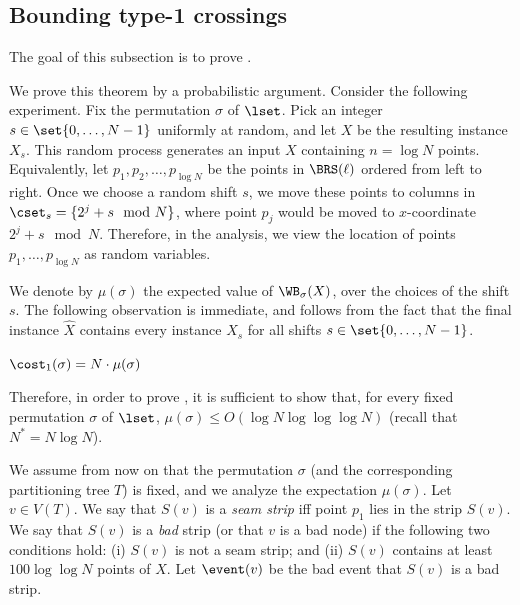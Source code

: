 %


%

%

%

%

%

%

%
%

%

%
%


%
%
%
\subsection{Bounding type-1 crossings}\label{subsec: type 1 crossings}

%
%
%

The goal of this subsection is to prove .

%
%
%


We prove this theorem by a probabilistic argument. 
Consider the following experiment. 
Fix the permutation $\sigma$ of $\lset$.  
%
Pick an integer $s \in \set{0,\ldots, N-1}$ uniformly at random, and let $X$ be the resulting instance $X_s$. 
This random process generates an input $X$ containing $n = \log N$ points.
Equivalently, let $p_1, p_2, \ldots, p_{\log N}$ be the points in $\BRS(\ell)$ ordered from left to right.  
Once we choose a random shift $s$, we move these points  to columns in $\cset_s = \{2^j + s \mod N \}$, where point $p_j$ would be moved to $x$-coordinate $2^j + s \mod N$. 
Therefore, in the analysis, we view the location of points $p_1,\ldots, p_{\log N}$ as random variables.
  
We denote by $\mu(\sigma)$ the expected value of $\WB_{\sigma}(X)$, over the choices of the shift $s$. The following observation is immediate, and follows from the fact that the final instance $\hat X$ contains every instance $X_s$ for all shifts $s\in \set{0,\ldots,N-1}$.

\begin{myobs}
$\cost_1(\sigma) = N \cdot \mu(\sigma)$ 
\end{myobs}  
%

Therefore, in order to prove , it is sufficient to show that, for every fixed permutation $\sigma$ of $\lset$, $\mu(\sigma)\leq  O(\log N\log\log\log N)$ (recall that $N^*=N\log N$).

%
%


We assume from now on that the permutation $\sigma$ (and the corresponding partitioning tree $T$) is fixed, and we analyze the expectation $\mu(\sigma)$.
Let $v \in V(T)$. We say that $S(v)$ is a \emph{seam strip} iff point $p_1$ lies in the strip $S(v)$. 
We say that $S(v)$ is a \emph{bad} strip (or that $v$ is a bad node) if the following two conditions hold: (i) $S(v)$ is not a seam strip; and (ii) $S(v)$ contains at least $100\log\log N$ points of $X$. 
Let $\event(v)$ be the bad event that $S(v)$ is a bad strip.
  



